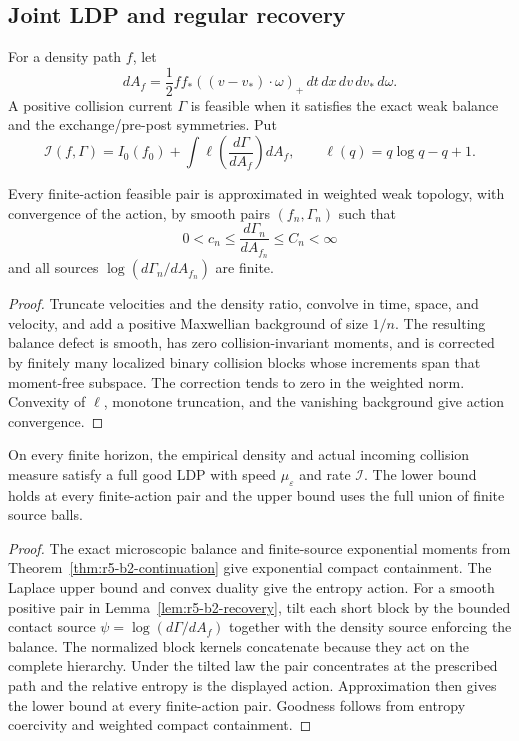 \subsection{Joint LDP and regular recovery}

For a density path \(f\), let
\[
 dA_f=\frac12ff_*((v-v_*)\cdot\omega)_+
       \,dt\,dx\,dv\,dv_*\,d\omega.
\]
A positive collision current \(\Gamma\) is feasible when it satisfies the
exact weak balance and the exchange/pre-post symmetries.  Put
\[
 {\mathcal I}(f,\Gamma)
 =I_0(f_0)+
 \int\ell\left(\frac{d\Gamma}{dA_f}\right)dA_f,
 \qquad
 \ell(q)=q\log q-q+1.
\]

\begin{lemma}
\label{lem:r5-b2-recovery}
Every finite-action feasible pair is approximated in weighted weak topology,
with convergence of the action, by smooth pairs
\((f_n,\Gamma_n)\) such that
\[
 0<c_n\le \frac{d\Gamma_n}{dA_{f_n}}\le C_n<\infty
\]
and all sources \(\log(d\Gamma_n/dA_{f_n})\) are finite.
\end{lemma}

\begin{proof}
Truncate velocities and the density ratio, convolve in time, space, and
velocity, and add a positive Maxwellian background of size \(1/n\).
The resulting balance defect is smooth, has zero collision-invariant moments,
and is corrected by finitely many localized binary collision blocks whose
increments span that moment-free subspace.  The correction tends to zero in
the weighted norm.  Convexity of \(\ell\), monotone truncation, and the
vanishing background give action convergence.
\end{proof}

\begin{theorem}
\label{thm:r5-b2-ldp}
On every finite horizon, the empirical density and actual incoming collision
measure satisfy a full good LDP with speed \(\mu_\varepsilon\) and rate
\({\mathcal I}\).  The lower bound holds at every finite-action pair and the
upper bound uses the full union of finite source balls.
\end{theorem}

\begin{proof}
The exact microscopic balance and finite-source exponential moments from
Theorem~\ref{thm:r5-b2-continuation} give exponential compact containment.
The Laplace upper bound and convex duality give the entropy action.  For a
smooth positive pair in Lemma~\ref{lem:r5-b2-recovery}, tilt each short block
by the bounded contact source
\(\psi=\log(d\Gamma/dA_f)\) together with the density source enforcing the
balance.  The normalized block kernels concatenate because they act on the
complete hierarchy.  Under the tilted law the pair concentrates at the
prescribed path and the relative entropy is the displayed action.
Approximation then gives the lower bound at every finite-action pair.
Goodness follows from entropy coercivity and weighted compact containment.
\end{proof}

